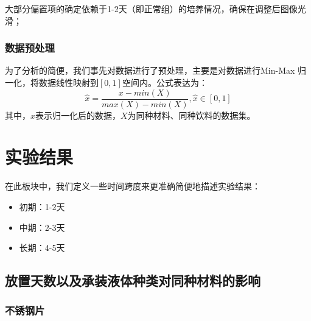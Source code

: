 \documentclass[12pt,a4paper]{ctexart}
\begin{document}
大部分偏置项的确定依赖于1-2天（即正常组）的培养情况，确保在调整后图像光滑；



\subsubsection{数据预处理}
为了分析的简便，我们事先对数据进行了预处理，主要是对数据进行Min-Max 归一化，将数据线性映射到$[0,1]$空间内。公式表达为：
\begin{equation}
    \hat{x}=\frac{x−min(X)​}{max(X)−min(X)},\hat{x} \in [0,1]
\end{equation}
其中，$\hat{x}$表示归一化后的数据，$X$为同种材料、同种饮料的数据集。
\section{实验结果}
在此板块中，我们定义一些时间跨度来更准确简便地描述实验结果：
\begin{itemize}
    \item 初期：1-2天
    \item 中期：2-3天
    \item 长期：4-5天
\end{itemize}
\subsection{放置天数以及承装液体种类对同种材料的影响}
\subsubsection{不锈钢片}
\end{document}
